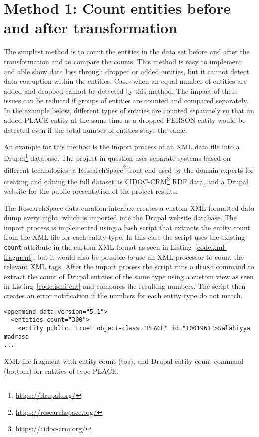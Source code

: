 \documentclass[final]{anthology-ch} %
\begin{document}
\section{Method 1: Count entities before and after transformation}

The simplest method is to count the entities in the data set before and after the transformation and to compare the counts. This method is easy to implement and able show data loss through dropped or added entities, but it cannot detect data corruption within the entities. Cases when an equal number of entities are added and dropped cannot be detected by this method. The impact of these issues can be reduced if groups of entities are counted and compared separately. In the example below, different types of entities are counted separately so that an added PLACE entity at the same time as a dropped PERSON entity would be detected even if the total number of entities stays the same.

An example for this method is the import process of an XML data file into a Drupal\footnote{\url{https://drupal.org/}} database. The project in question uses separate systems based on different technologies: a ResearchSpace\footnote{\url{https://researchspace.org/}} front end used by the domain experts for creating and editing the full dataset as CIDOC-CRM\footnote{\url{https://cidoc-crm.org/}} RDF data, and a Drupal website for the public presentation of the project results.

The ResearchSpace data curation interface creates a custom XML formatted data dump every night, which is imported into the Drupal website database. The import process is implemented using a bash script that extracts the entity count from the XML file for each entity type. In this case the script uses the existing \texttt{count} attribute in the custom XML format as seen in Listing~\ref{code:xml-fragment}, but it would also be possible to use an XML processor to count the relevant XML tags. After the import process the script runs a \texttt{drush} command to extract the count of Drupal entities of the same type using a custom view as seen in Listing~\ref{code:ismi-cnt} and compares the resulting numbers. The script then creates an error notification if the numbers for each entity type do not match.

\begin{listing}
\begin{verbatim}
<openmind-data version="5.1">
  <entities count="300">
    <entity public="true" object-class="PLACE" id="1001961">Salähiyya madrasa
...
\end{verbatim}
 \caption{XML file fragment with entity count (top), and Drupal entity count command (bottom) for entities of type PLACE.}
\label{code:xml-fragment}
\end{listing}
\end{document}
